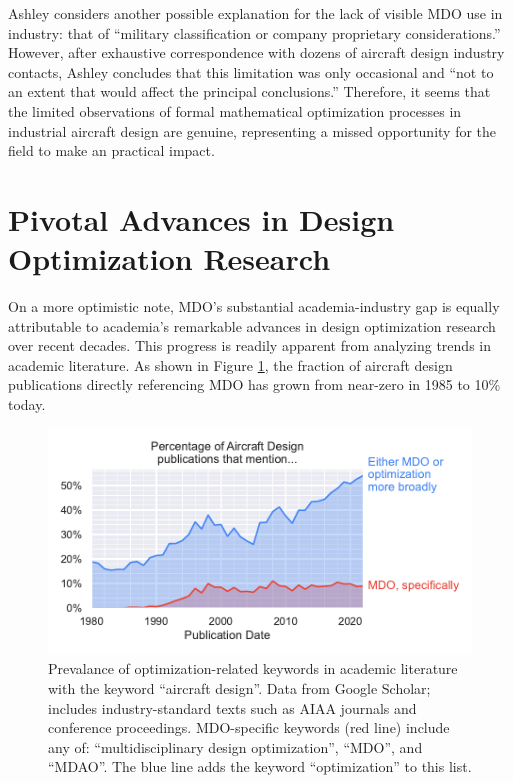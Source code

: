 \documentclass[12pt,vi,oneside,table]{report}
\begin{document}
    Ashley considers another possible explanation for the lack of visible MDO use in industry: that of ``military classification or company proprietary considerations.'' \cite{ashley_making_1982} However, after exhaustive correspondence with dozens of aircraft design industry contacts, Ashley concludes that this limitation was only occasional and ``not to an extent that would affect the principal conclusions.'' Therefore, it seems that the limited observations of formal mathematical optimization processes in industrial aircraft design are genuine, representing a missed opportunity for the field to make an practical impact.


    \section{Pivotal Advances in Design Optimization Research}
    \label{sec:literature_advances}

    On a more optimistic note, MDO's substantial academia-industry gap is equally attributable to academia's remarkable advances in design optimization research over recent decades. This progress is readily apparent from analyzing trends in academic literature. As shown in Figure \ref{fig:mdo_citation_counts}, the fraction of aircraft design publications directly referencing MDO has grown from near-zero in 1985 to 10\% today.

    \begin{figure}[h]
        \centering
        \includegraphics{../figures/mdo_citation_counts}
        \caption{Prevalance of optimization-related keywords in academic literature with the keyword ``aircraft design''. Data from Google Scholar; includes industry-standard texts such as AIAA journals and conference proceedings. MDO-specific keywords (red line) include any of: ``multidisciplinary design optimization'', ``MDO'', and ``MDAO''. The blue line adds the keyword ``optimization'' to this list.}
        \label{fig:mdo_citation_counts}
    \end{figure}
\end{document}
